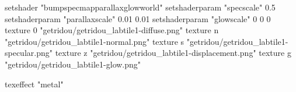 setshader "bumpspecmapparallaxglowworld"
setshaderparam "specscale" 0.5
setshaderparam "parallaxscale" 0.01 0.01
setshaderparam "glowscale" 0 0 0
texture 0 "getridou/getridou_labtile1-diffuse.png"
texture n "getridou/getridou_labtile1-normal.png"
texture s "getridou/getridou_labtile1-specular.png"
texture z "getridou/getridou_labtile1-displacement.png"
texture g "getridou/getridou_labtile1-glow.png"

texeffect "metal"
